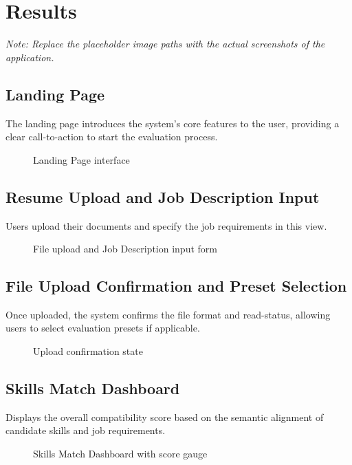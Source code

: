 \documentclass[12pt,a4paper]{article}
\begin{document}
\section{Results}
\textit{Note: Replace the placeholder image paths with the actual screenshots of the application.}

\subsection{Landing Page}
The landing page introduces the system's core features to the user, providing a clear call-to-action to start the evaluation process.
\begin{figure}[H]
    \centering
    \fbox{\rule{0pt}{2in} \rule{0.8\textwidth}{0pt}}
    \caption{Landing Page interface}
    \label{fig:landing}
\end{figure}

\subsection{Resume Upload and Job Description Input}
Users upload their documents and specify the job requirements in this view.
\begin{figure}[H]
    \centering
    \fbox{\rule{0pt}{2in} \rule{0.8\textwidth}{0pt}}
    \caption{File upload and Job Description input form}
    \label{fig:upload}
\end{figure}

\subsection{File Upload Confirmation and Preset Selection}
Once uploaded, the system confirms the file format and read-status, allowing users to select evaluation presets if applicable.
\begin{figure}[H]
    \centering
    \fbox{\rule{0pt}{2in} \rule{0.8\textwidth}{0pt}}
    \caption{Upload confirmation state}
    \label{fig:confirm}
\end{figure}

\subsection{Skills Match Dashboard}
Displays the overall compatibility score based on the semantic alignment of candidate skills and job requirements.
\begin{figure}[H]
    \centering
    \fbox{\rule{0pt}{2in} \rule{0.8\textwidth}{0pt}}
    \caption{Skills Match Dashboard with score gauge}
    \label{fig:match}
\end{figure}
\end{document}
